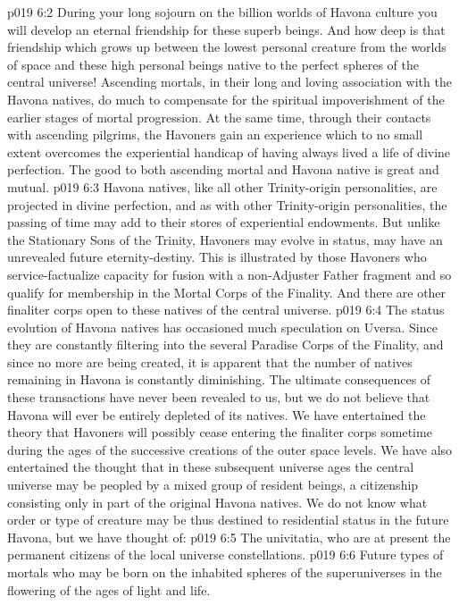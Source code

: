 \vs p019 6:2 During your long sojourn on the billion worlds of Havona culture you will develop an eternal friendship for these superb beings. And how deep is that friendship which grows up between the lowest personal creature from the worlds of space and these high personal beings native to the perfect spheres of the central universe! Ascending mortals, in their long and loving association with the Havona natives, do much to compensate for the spiritual impoverishment of the earlier stages of mortal progression. At the same time, through their contacts with ascending pilgrims, the Havoners gain an experience which to no small extent overcomes the experiential handicap of having always lived a life of divine perfection. The good to both ascending mortal and Havona native is great and mutual.
\vs p019 6:3 \pc Havona natives, like all other Trinity\hyp{}origin personalities, are projected in divine perfection, and as with other Trinity\hyp{}origin personalities, the passing of time may add to their stores of experiential endowments. But unlike the Stationary Sons of the Trinity, Havoners may evolve in status, may have an unrevealed future eternity\hyp{}destiny. This is illustrated by those Havoners who service\hyp{}factualize capacity for fusion with a non\hyp{}Adjuster Father fragment and so qualify for membership in the Mortal Corps of the Finality. And there are other finaliter corps open to these natives of the central universe.
\vs p019 6:4 \pc The status evolution of Havona natives has occasioned much speculation on Uversa. Since they are constantly filtering into the several Paradise Corps of the Finality, and since no more are being created, it is apparent that the number of natives remaining in Havona is constantly diminishing. The ultimate consequences of these transactions have never been revealed to us, but we do not believe that Havona will ever be entirely depleted of its natives. We have entertained the theory that Havoners will possibly cease entering the finaliter corps sometime during the ages of the successive creations of the outer space levels. We have also entertained the thought that in these subsequent universe ages the central universe may be peopled by a mixed group of resident beings, a citizenship consisting only in part of the original Havona natives. We do not know what order or type of creature may be thus destined to residential status in the future Havona, but we have thought of:
\vs p019 6:5 \bibnobreakspace The univitatia, who are at present the permanent citizens of the local universe constellations.
\vs p019 6:6 \bibnobreakspace Future types of mortals who may be born on the inhabited spheres of the superuniverses in the flowering of the ages of light and life.
